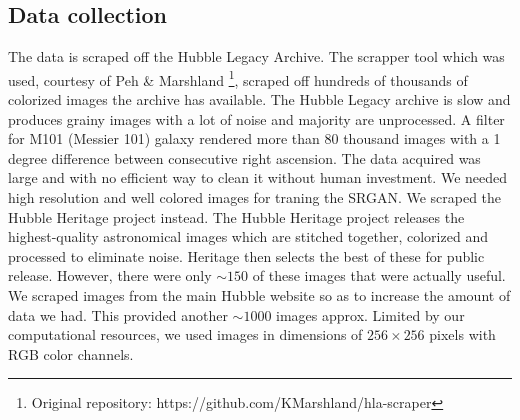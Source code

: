 \documentclass[10pt,twocolumn,letterpaper]{article}
\begin{document}
    \subsection{Data collection}
    \hspace*{0.167 in}The data is scraped off the Hubble Legacy Archive. The scrapper tool %
    which was used, courtesy of Peh \& Marshland \cite{Gao2019astronomical}\footnote{Original repository: https://github.com/KMarshland/hla-scraper}, scraped off hundreds of thousands of colorized images the archive has available. The Hubble Legacy archive is slow and produces grainy images with a lot of noise and majority are unprocessed. A filter for M101 (Messier 101) galaxy rendered more than 80 thousand images with a 1 degree difference between consecutive right ascension. The data acquired was large and with no efficient way to clean it without human investment. We needed high resolution and well colored images for traning the SRGAN. We scraped the Hubble Heritage project instead. The Hubble Heritage project releases the highest-quality astronomical images which are stitched together, colorized and processed to eliminate noise. Heritage then selects the best of these for public release. However, there were only $\sim150$ of these images that were actually useful. We scraped images from the main Hubble website so as to increase the amount of data we had. This provided another $\sim1000$ images approx. Limited by our computational resources, we used images in dimensions of $256\times 256$ pixels with RGB color channels.
\end{document}
